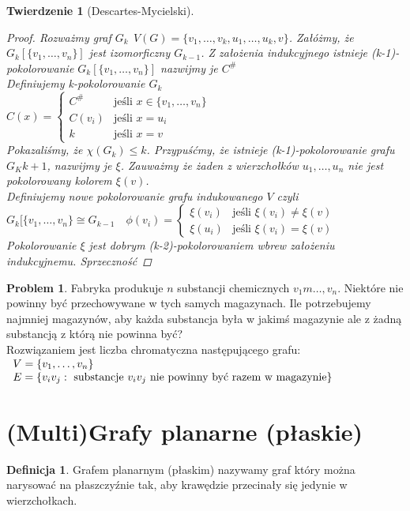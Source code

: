 \documentclass[12pt,a4paper]{article}
\newtheorem{tw}{Twierdzenie}
\theoremstyle{definition}
\newtheorem{df}{Definicja}
\newtheorem{problem}{Problem}
\begin{document}
\begin{tw}[Descartes-Mycielski]
\begin{proof}
Rozważmy graf $G_k~~ V(G)=\{v_1,\dots ,v_k, u_1,\dots, u_k, v\}$. Załóżmy, że $G_k[\{v_1,\dots,v_n\}]$ jest izomorficzny $G_{k-1}$. Z założenia indukcyjnego istnieje (k-1)-pokolorowanie $G_k[\{v_1,\dots,v_n\}]$ nazwijmy je $C^\#$\\
Definiujemy k-pokolorowanie $G_k$\\
$C(x) = \left\{\begin{matrix}
C^\# & \text{jeśli } x\in\{v_1,\dots,v_n\}\\
C(v_i) & \text{jeśli } x=u_i\\
k & \text{jeśli } x=v
\end{matrix}\right.$\\
Pokazaliśmy, że $\chi(G_k) \leqslant k$. Przypuśćmy, że istnieje (k-1)-pokolorowanie grafu $G_K{k+1}$, nazwijmy je $\xi$. Zauważmy że żaden z wierzchołków $u_1,\dots,u_n$ nie jest pokolorowany kolorem $\xi(v)$.\\
Definiujemy nowe pokolorowanie grafu indukowanego $V$ czyli $G_k[\{v_1,\dots,v_n\} \cong G_{k-1}\quad \phi(v_i) = 
\left\{\begin{matrix}
	\xi(v_i) & \text{jeśli } \xi(v_i) \neq \xi(v)\\
	\xi(u_i) & \text{jeśli } \xi(v_i) = \xi(v)
\end{matrix}\right.$
Pokolorowanie $\xi$ jest dobrym (k-2)-pokolorowaniem wbrew założeniu indukcyjnemu. Sprzeczność
\end{proof}
\end{tw}


\begin{problem}
Fabryka produkuje $n$ substancji chemicznych $v_1m\dots,v_n$. Niektóre nie powinny być przechowywane w tych samych magazynach. Ile potrzebujemy najmniej magazynów, aby każda substancja była w jakimś magazynie ale z żadną substancją z którą nie powinna być?\\
Rozwiązaniem jest liczba chromatyczna następującego grafu:
$\begin{array}{l l}
V = \{v_1,\dots,v_n\} \\ 
E =  \{v_iv_j : ~ \text{substancje } v_iv_j \text{ nie powinny być razem w magazynie}\}
\end{array}$
\end{problem}

\section{(Multi)Grafy planarne (płaskie)}
\begin{df}
Grafem planarnym (płaskim) nazywamy graf który można narysować na płaszczyźnie tak, aby krawędzie przecinały się jedynie w wierzchołkach.
\end{df}
\end{document}
